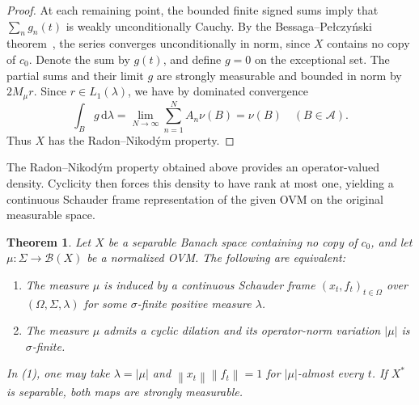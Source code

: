 \documentclass[11pt,leqno]{amsart}
\theoremstyle{compact}
\numberwithin{equation}{section}
\newtheorem{theorem}{Theorem}[section]
\theoremstyle{compactremark}
\theoremstyle{compact}
\newcommand{\1}{\mathbbm{1}}
\newcommand{\rmd}{\mathrm{d}}
\newcommand{\cB}{\mathcal{B}}
\newcommand{\norm}[1]{\left\|#1\right\|}
\newcommand{\abs}[1]{\left|#1\right|}
\begin{document}
\begin{proof}
At each remaining point, the bounded finite signed sums imply that $\sum_ng_n(t)$ is weakly unconditionally Cauchy. By the Bessaga--Pe\l czy\'nski theorem~\cite{BessagaPelczynski1958}, the series converges unconditionally in norm, since $X$ contains no copy of $c_0$. Denote the sum by $g(t)$, and define $g=0$ on the exceptional set. The partial sums and their limit $g$ are strongly measurable and bounded in norm by $2M_\mu r$. Since $r\in L_1(\lambda)$, we have by dominated convergence
\[
\int_Bg\,\rmd\lambda
=\lim_{N\to\infty}\sum_{n=1}^{N}A_n\nu(B)=\nu(B)
\quad(B\in\mathcal A).
\]
Thus $X$ has the Radon--Nikod\'ym property.
\end{proof}

The Radon--Nikod\'ym property obtained above provides an operator-valued density. Cyclicity then forces this density to have rank at most one, yielding a continuous Schauder frame representation of the given OVM on the original measurable space.

\begin{theorem}\label{thm:continuous-frame-representation}
Let $X$ be a separable Banach space containing no copy of $c_0$, and let $\mu\colon\Sigma\to\cB(X)$ be a normalized OVM. The following are equivalent:
\begin{enumerate}
\item The measure $\mu$ is induced by a continuous Schauder frame $(x_t,f_t)_{t\in\Omega}$ over $(\Omega,\Sigma,\lambda)$ for some $\sigma$-finite positive measure $\lambda$.
\item The measure $\mu$ admits a cyclic dilation and its operator-norm variation $\abs{\mu}$ is $\sigma$-finite.
\end{enumerate}
In (1), one may take $\lambda=\abs{\mu}$ and $\norm{x_t}\norm{f_t}=1$ for $\abs{\mu}$-almost every $t$. If $X^*$ is separable, both maps are strongly measurable.
\end{theorem}
\end{document}
